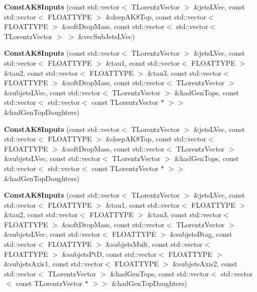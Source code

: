 \begin{DoxyCompactItemize}
\item 
\hypertarget{classttUtility_1_1ConstAK8Inputs_ae6320ad910e29f1ee59333ada94025a4}{{\bfseries Const\-A\-K8\-Inputs} (const std\-::vector$<$ T\-Lorentz\-Vector $>$ \&jets\-L\-Vec, const std\-::vector$<$ F\-L\-O\-A\-T\-T\-Y\-P\-E $>$ \&deep\-A\-K8\-Top, const std\-::vector$<$ F\-L\-O\-A\-T\-T\-Y\-P\-E $>$ \&soft\-Drop\-Mass, const std\-::vector$<$ std\-::vector$<$ T\-Lorentz\-Vector $>$ $>$ \&vec\-Sub\-Jets\-L\-Vec)}\label{classttUtility_1_1ConstAK8Inputs_ae6320ad910e29f1ee59333ada94025a4}

\item 
\hypertarget{classttUtility_1_1ConstAK8Inputs_aa102483387045bf6e6ca9250f39d1a09}{{\bfseries Const\-A\-K8\-Inputs} (const std\-::vector$<$ T\-Lorentz\-Vector $>$ \&jets\-L\-Vec, const std\-::vector$<$ F\-L\-O\-A\-T\-T\-Y\-P\-E $>$ \&tau1, const std\-::vector$<$ F\-L\-O\-A\-T\-T\-Y\-P\-E $>$ \&tau2, const std\-::vector$<$ F\-L\-O\-A\-T\-T\-Y\-P\-E $>$ \&tau3, const std\-::vector$<$ F\-L\-O\-A\-T\-T\-Y\-P\-E $>$ \&soft\-Drop\-Mass, const std\-::vector$<$ T\-Lorentz\-Vector $>$ \&subjets\-L\-Vec, const std\-::vector$<$ T\-Lorentz\-Vector $>$ \&had\-Gen\-Tops, const std\-::vector$<$ std\-::vector$<$ const T\-Lorentz\-Vector $\ast$ $>$$>$ \&had\-Gen\-Top\-Daughters)}\label{classttUtility_1_1ConstAK8Inputs_aa102483387045bf6e6ca9250f39d1a09}

\item 
\hypertarget{classttUtility_1_1ConstAK8Inputs_a873884e460a5a649560cfbf0b0fa7db3}{{\bfseries Const\-A\-K8\-Inputs} (const std\-::vector$<$ T\-Lorentz\-Vector $>$ \&jets\-L\-Vec, const std\-::vector$<$ F\-L\-O\-A\-T\-T\-Y\-P\-E $>$ \&deep\-A\-K8\-Top, const std\-::vector$<$ F\-L\-O\-A\-T\-T\-Y\-P\-E $>$ \&soft\-Drop\-Mass, const std\-::vector$<$ T\-Lorentz\-Vector $>$ \&subjets\-L\-Vec, const std\-::vector$<$ T\-Lorentz\-Vector $>$ \&had\-Gen\-Tops, const std\-::vector$<$ std\-::vector$<$ const T\-Lorentz\-Vector $\ast$ $>$$>$ \&had\-Gen\-Top\-Daughters)}\label{classttUtility_1_1ConstAK8Inputs_a873884e460a5a649560cfbf0b0fa7db3}

\item 
\hypertarget{classttUtility_1_1ConstAK8Inputs_a55c6c535734b2ebcabc13821d64848f6}{{\bfseries Const\-A\-K8\-Inputs} (const std\-::vector$<$ T\-Lorentz\-Vector $>$ \&jets\-L\-Vec, const std\-::vector$<$ F\-L\-O\-A\-T\-T\-Y\-P\-E $>$ \&tau1, const std\-::vector$<$ F\-L\-O\-A\-T\-T\-Y\-P\-E $>$ \&tau2, const std\-::vector$<$ F\-L\-O\-A\-T\-T\-Y\-P\-E $>$ \&tau3, const std\-::vector$<$ F\-L\-O\-A\-T\-T\-Y\-P\-E $>$ \&soft\-Drop\-Mass, const std\-::vector$<$ T\-Lorentz\-Vector $>$ \&subjets\-L\-Vec, const std\-::vector$<$ F\-L\-O\-A\-T\-T\-Y\-P\-E $>$ \&subjets\-Btag, const std\-::vector$<$ F\-L\-O\-A\-T\-T\-Y\-P\-E $>$ \&subjets\-Mult, const std\-::vector$<$ F\-L\-O\-A\-T\-T\-Y\-P\-E $>$ \&subjets\-Pt\-D, const std\-::vector$<$ F\-L\-O\-A\-T\-T\-Y\-P\-E $>$ \&subjets\-Axis1, const std\-::vector$<$ F\-L\-O\-A\-T\-T\-Y\-P\-E $>$ \&subjets\-Axis2, const std\-::vector$<$ T\-Lorentz\-Vector $>$ \&had\-Gen\-Tops, const std\-::vector$<$ std\-::vector$<$ const T\-Lorentz\-Vector $\ast$ $>$$>$ \&had\-Gen\-Top\-Daughters)}\label{classttUtility_1_1ConstAK8Inputs_a55c6c535734b2ebcabc13821d64848f6}


\end{DoxyCompactItemize}
